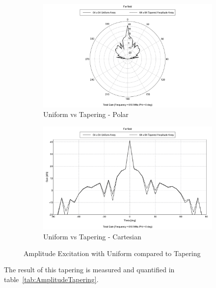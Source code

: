\documentclass[11pt]{witseiepaper}
\begin{document}
\begin{bibunit}[witseie]
\begin{figure}[htb]
    \centering
    \begin{subfigure}{.5\textwidth}
        \centering
            \includegraphics[width=0.9\linewidth]{AmplitudeTapering-Polar.pdf}
            \caption{Uniform vs Tapering - Polar}
            \label{fig:PowerTapering-Polar}
        \end{subfigure}%
        \begin{subfigure}{.5\textwidth}
            \centering
            \includegraphics[width=0.9\linewidth]{AmplitudeTapering-Cartesian.pdf}
            \caption{Uniform vs Tapering - Cartesian}
                \label{fig:PowerTapering-Cartesian}
            \end{subfigure}
\caption{Amplitude Excitation with Uniform compared to Tapering}
\label{fig:PowerTapering}
\end{figure}

The result of this tapering is measured and quantified in table~\ref{tab:AmplitudeTapering}.


\end{bibunit}
\end{document}
